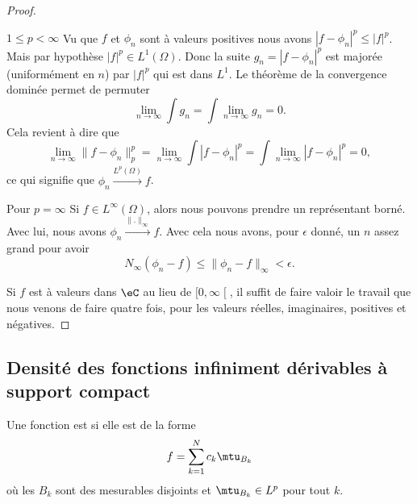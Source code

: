 \begin{proof}
	\begin{subproof}
		\item[\( 1\leq p<\infty\)]
		Vu que \( f\) et \( \phi_n\) sont à valeurs positives nous avons \( | f-\phi_n |^p\leq | f |^p\). Mais par hypothèse \( | f |^p\in L^1(\Omega)\). Donc la suite \( g_n=| f-\phi_n |^p\) est majorée (uniformément en \( n\)) par \( | f |^p\) qui est dans \( L^1\). Le théorème de la convergence dominée permet de permuter
		\begin{equation}
			\lim_{n\to \infty} \int g_n=\int \lim_{n\to \infty} g_n=0.
		\end{equation}
		Cela revient à dire que
		\begin{equation}
			\lim_{n\to \infty} \| f-\phi_n \|^p_p=\lim_{n\to \infty} \int| f-\phi_n |^p=\int\lim_{n\to \infty} | f-\phi_n |^p=0,
		\end{equation}
		ce qui signifie que \( \phi_n\stackrel{L^p(\Omega)}{\longrightarrow}f\).
		\item[Pour \( p=\infty\)]
		Si \( f\in L^{\infty}(\Omega)\), alors nous pouvons prendre un représentant borné. Avec lui, nous avons \( \phi_n\stackrel{\| . \|_{\infty}}{\longrightarrow}f\). Avec cela nous avons, pour \( \epsilon\) donné, un \( n\) assez grand pour avoir
		\begin{equation}
			N_{\infty}(\phi_n-f)\leq \| \phi_n-f \|_{\infty}<\epsilon.
		\end{equation}
	\end{subproof}
	Si \( f\) est à valeurs dans \( \eC\) au lieu de \( \mathopen[ 0 , \infty \mathclose[\), il suffit de faire valoir le travail que nous venons de faire quatre fois, pour les valeurs réelles, imaginaires, positives et négatives.
\end{proof}

\subsection{Densité des fonctions infiniment dérivables à support compact}

\begin{definition}
	Une fonction est  si elle est de la forme
	\begin{equation}
		f=\sum_{k=1}^Nc_k\mtu_{B_k}
	\end{equation}
	où les \( B_k\) sont des mesurables disjoints et \( \mtu_{B_k}\in L^p\) pour tout \( k\).
\end{definition}

